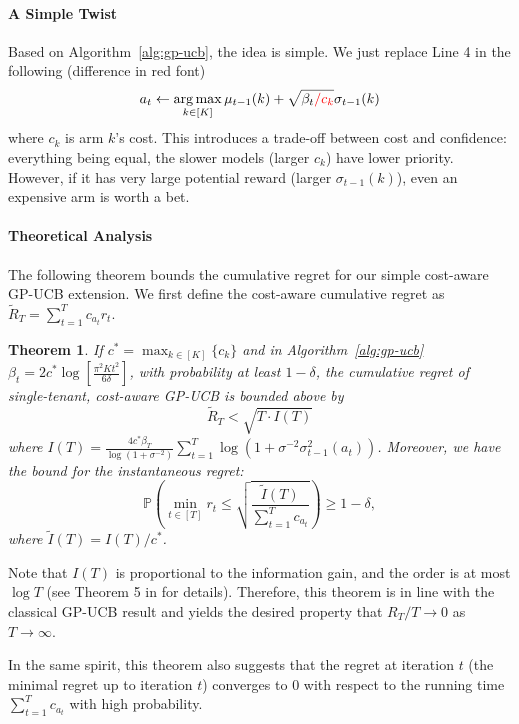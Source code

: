 \documentclass[letterpaper]{vldb}
\newtheorem{theorem}{Theorem}
\newcommand{\bP}{\mathbb{P}} %
\DeclareMathOperator*{\argmax}{arg\,max}
\begin{document}
\vspace{-0.75em}
\paragraph*{A Simple Twist} Based on Algorithm~\ref{alg:gp-ucb}, the idea is simple. 
We just replace Line 4 in the following (difference in red font)
\[
a_t \leftarrow \argmax_{k\in [K]}\mu_{t-1}(k) + \sqrt{\beta_t \textcolor{red}{/ c_k}}\sigma_{t-1}(k)
\]
where $c_k$ is arm $k$'s cost.
This introduces a trade-off between 
cost and confidence: everything being equal, 
the slower models (larger $c_k$) have lower priority. However,
if it has very large potential reward (larger $\sigma_{t-1}(k)$),
even an expensive arm is worth a bet.

\vspace{-0.75em}
\paragraph*{Theoretical Analysis}
The following theorem bounds the cumulative regret
for our simple cost-aware GP-UCB extension.
We first define the cost-aware cumulative regret
as $\tilde{R}_T=\sum\nolimits_{t=1}^{T} c_{a_t} r_t$.

\vspace{-0.75em}
\begin{theorem}
  \label{thm:cost}
  If $c^\ast = \max_{k\in [K]}\{c_k\}$ and
  in Algorithm~\ref{alg:gp-ucb}
  $\beta_t = 2c^\ast \log\left[\frac{\pi^2 K t^2}{6\delta}\right]$, with probability at least $1-\delta$,
  the cumulative regret of single-tenant, cost-aware GP-UCB is bounded above by
  \[
  \tilde{R}_T < \sqrt{T\cdot I(T)}
  \]
where $
I(T) = \frac{4c^\ast \beta_T}{\log(1 + \sigma^{-2})}\sum_{t=1}^T \log(1+\sigma^{-2}\sigma^2_{t-1}(a_t))$.
Moreover, we have the bound for the instantaneous regret:
\[
    \bP\left(\min_{t\in [T]}r_t \le \sqrt{\frac{\tilde{I}(T)}{\sum_{t=1}^T
        c_{a_t}}}\right) \ge 1-\delta,
\]
where $\tilde{I}(T) = I(T)/c^\ast$.
\end{theorem}
Note that $I(T)$ is proportional to the information gain, and the order is at most $\log T$ (see Theorem 5 in \cite{SrinivasKKS10} for details). Therefore, this theorem is in line with the classical GP-UCB result and yields the desired property that $R_T/T \to 0$ as $T\to \infty$.

In the same spirit, this theorem also suggests that the regret at iteration $t$ (the minimal regret up to iteration $t$) converges to $0$ with respect to the running time $\sum_{t=1}^T c_{a_t}$ with high probability. 
\end{document}
